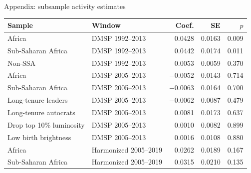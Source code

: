 \documentclass[aspectratio=169, 11pt]{beamer}
\begin{document}
\appendix

\begin{frame}[noframenumbering]{Appendix: subsample activity estimates}
    \centering
    \tiny
    \begin{tabular}{llrrr}
        \toprule
        Sample & Window & Coef. & SE & $p$ \\
        \midrule
        Africa & DMSP 1992--2013 & 0.0428 & 0.0163 & 0.009 \\
        Sub-Saharan Africa & DMSP 1992--2013 & 0.0442 & 0.0174 & 0.011 \\
        Non-SSA & DMSP 1992--2013 & 0.0053 & 0.0059 & 0.370 \\
        \midrule
        Africa & DMSP 2005--2013 & $-0.0052$ & 0.0143 & 0.714 \\
        Sub-Saharan Africa & DMSP 2005--2013 & $-0.0063$ & 0.0164 & 0.700 \\
        Long-tenure leaders & DMSP 2005--2013 & $-0.0062$ & 0.0087 & 0.479 \\
        Long-tenure autocrats & DMSP 2005--2013 & 0.0081 & 0.0173 & 0.637 \\
        Drop top 10\% luminosity & DMSP 2005--2013 & 0.0010 & 0.0082 & 0.899 \\
        Low birth brightness & DMSP 2005--2013 & 0.0016 & 0.0108 & 0.880 \\
        \midrule
        Africa & Harmonized 2005--2019 & 0.0262 & 0.0189 & 0.167 \\
        Sub-Saharan Africa & Harmonized 2005--2019 & 0.0315 & 0.0210 & 0.135 \\
        \bottomrule
    \end{tabular}
\end{frame}
\end{document}

